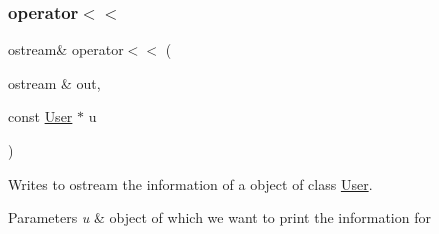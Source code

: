 \subsubsection{\texorpdfstring{operator$<$$<$}{operator<<}}
{\footnotesize\ttfamily ostream\& operator$<$$<$ (\begin{DoxyParamCaption}\item[{ostream \&}]{out,  }\item[{const \hyperlink{class_user}{User} $\ast$}]{u }\end{DoxyParamCaption})\hspace{0.3cm}{\ttfamily [friend]}}



Writes to ostream the information of a object of class \hyperlink{class_user}{User}. 


\begin{DoxyParams}{Parameters}
{\em u} & object of which we want to print the information for \\
\hline
\end{DoxyParams}

